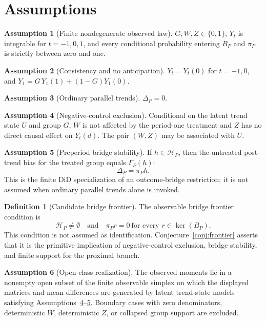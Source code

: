 \documentclass[11pt]{article}
\theoremstyle{definition}
\newtheorem{definition}{Definition}
\newtheorem{assumption}{Assumption}
\theoremstyle{plain}
\theoremstyle{remark}
\begin{document}
\section{Assumptions}
\begin{assumption}[Finite nondegenerate observed law]\label{ass:finite}
\(G,W,Z\in\{0,1\}\), \(Y_t\) is integrable for \(t=-1,0,1\), and every conditional probability entering \(B_P\) and \(\pi_P\) is strictly between zero and one.
\end{assumption}

\begin{assumption}[Consistency and no anticipation]\label{ass:consistency}
\(Y_t=Y_t(0)\) for \(t=-1,0\), and \(Y_1=G\,Y_1(1)+(1-G)Y_1(0)\).
\end{assumption}

\begin{assumption}[Ordinary parallel trends]\label{ass:parallel}
\(\Delta_P=0\).
\end{assumption}

\begin{assumption}[Negative-control exclusion]\label{ass:nc}
Conditional on the latent trend state \(U\) and group \(G\), \(W\) is not affected by the period-one treatment and \(Z\) has no direct causal effect on \(Y_t(d)\).  The pair \((W,Z)\) may be associated with \(U\).
\end{assumption}

\begin{assumption}[Preperiod bridge stability]\label{ass:stability}
If \(h\in\mathcal H_P\), then the untreated post-trend bias for the treated group equals \(\Gamma_P(h)\):
\[
\Delta_P=\pi_Ph.
\]
This is the finite DiD specialization of an outcome-bridge restriction; it is not assumed when ordinary parallel trends alone is invoked.
\end{assumption}

\begin{definition}[Candidate bridge frontier]\label{def:frontier}
The observable bridge frontier condition is
\[
\mathcal H_P\neq\emptyset
\quad\text{and}\quad
\pi_Pr=0\ \text{for every }r\in\operatorname{ker}(B_P).
\]
This condition is not assumed as identification.  Conjecture~\ref{conj:frontier} asserts that it is the primitive implication of negative-control exclusion, bridge stability, and finite support for the proximal branch.
\end{definition}

\begin{assumption}[Open-class realization]\label{ass:openclass}
The observed moments lie in a nonempty open subset of the finite observable simplex on which the displayed matrices and mean differences are generated by latent trend-state models satisfying Assumptions~\ref{ass:nc}--\ref{ass:stability}.  Boundary cases with zero denominators, deterministic \(W\), deterministic \(Z\), or collapsed group support are excluded.
\end{assumption}
\end{document}
